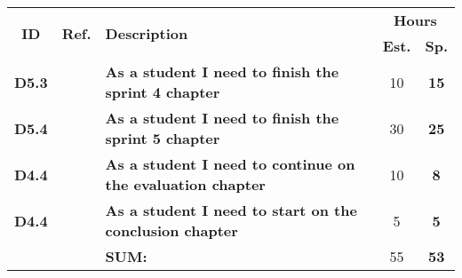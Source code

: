   \label{tab:sprint5Documentationstories}
 \def\arraystretch{1.25}
 
\begin{longtable}{ccXcc}

\toprule[0.5mm]
\multirow{2}{*}{\textbf{ID}} &
\multirow{2}{*}{\textbf{Ref.}} & \multirow{2}{*}{\textbf{Description}} & \multicolumn{2}{c}{\textbf{Hours}} \\
 					& & & \textbf{Est.} & \textbf{Sp.} \\
\midrule

	
\textbf{D5.3} 	&	& {\bf As a student I need to finish the sprint 4 chapter} 					&   10  & \textbf{15} \\

\textbf{D5.4} 	&	& {\bf As a student I need to finish the sprint 5 chapter} 					& 	30 	& \textbf{25} \\

\textbf{D4.4} 	&	& {\bf As a student I need to continue on the evaluation chapter} 			& 	10 	& \textbf{8} \\

\textbf{D4.4} 	&	& {\bf As a student I need to start on the conclusion chapter} 				& 	5 	& \textbf{5} \\


\midrule
		
				&	& \textbf{SUM:}		&		55	& \textbf{53}
 \\																			
\bottomrule[0.5mm]
\end{longtable}
